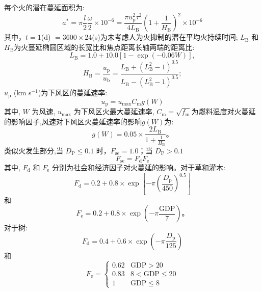每个火的潜在蔓延面积为:
%
\begin{equation}
  a^{*}=\pi \frac{l}{2} \frac{\omega}{2} \times 10^{-6}=\frac{\pi u_{\mathrm{p}}^{2} \tau^{2}}{4 L_{\mathrm{B}}}\left(1+\frac{1}{H_{\mathrm{B}}}\right)^{2} \times 10^{-6}
\end{equation}
%
其中，$t = 1$(d) $= 3600\times24$(s)为未考虑人为火抑制的潜在平均火持续时间; $L_{\mathrm {B}} $ 和 $H_{\mathrm {B}} $为火蔓延椭圆区域的长宽比和焦点距离长轴两端的距离比:
\begin{equation}
  L_{\mathrm{B}}=1.0+10.0\left[1-\exp (-0.06 W)\right],
\end{equation}
\begin{equation}
  H_{\mathrm{B}}=\frac{u_{\mathrm{p}}}{u_{\mathrm{b}}}=\frac{L_{\mathrm{B}}+\left(L_{\mathrm{B}}^{2}-1\right)^{0.5}}{L_{\mathrm{B}}-\left(L_{\mathrm{B}}^{2}-1\right)^{0.5}};
\end{equation}
$u_{\mathrm {p}} $ (km s$^{-1}$)为下风区的蔓延速率:
\begin{equation}
  u_{\mathrm{p}}=u_{\max } C_{\mathrm{m}} g(W)
\end{equation}
%
其中, $W$ 为风速, $u_{\mathrm{max}}$ 为下风区火最大蔓延速率, $C_{\mathrm{m}}=\sqrt{f_{\mathrm{m}}}$为燃料湿度对火蔓延的影响因子,风速对下风区火蔓延速率的影响$g(W)$为:
\begin{equation}
  g(W)=0.05 \times \frac{2 L_{\mathrm{B}}}{1+\frac{1}{H_{\mathrm{B}}}}。
\end{equation}
类似火发生部分,当 $D_{\mathrm {P}}  \leqslant 0.1$ 时，$F_{\mathrm{se}} = 1.0$；当 $D_{\mathrm {P}}  > 0.1$
%
\begin{equation}
  F_{\mathrm{se}} = F_{\mathrm {d}}  F_{\mathrm {e}}
\end{equation}
%
其中, $F_{\mathrm {d}} $ 和 $F_{\mathrm {e}} $ 分别为社会和经济因子对火蔓延的影响。对于草和灌木:
\begin{equation}
  F_{\mathrm{d}}=0.2+0.8 \times \exp \left[-\pi\left(\frac{D_{\mathrm{p}}}{450}\right)^{0.5}\right]
\end{equation}
和
\begin{equation}
  F_{\mathrm{e}}=0.2+0.8 \times \exp \left(-\pi \frac{\text{GDP}}{7}\right)。
\end{equation}
对于树:
\begin{equation}
  F_{\mathrm{d}}=0.4+0.6 \times \exp \left(-\pi \frac{D_{\mathrm{p}}}{125}\right)
\end{equation}
和
\begin{equation}
  F_{\mathrm{e}}=\begin{cases}
    0.62 & \text{GDP}>20 \\
    0.83 & 8< \text{GDP} \leqslant 20 \\
    1 & \text{GDP} \leqslant 8
  \end{cases}
\end{equation}


